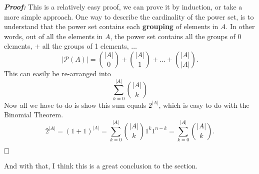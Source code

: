 \documentclass{report}
\begin{document}
\textbf{\textit{Proof:}} This is a relatively easy proof, we can prove it by induction, or take a more simple approach. One way to describe the cardinality of the power set, is to understand
that the power set contains each \textbf{grouping} of elements in $A$. In other words, out of all the elements in $A$, the power set contains all the groups of 0 elements, $+$ all the groups of 1 elements, $\dots$
$$|\mathcal{P}(A)| = {|A| \choose 0} + {|A| \choose 1} + \dots + {|A| \choose |A|}.$$
This can easily be re-arranged into $$\sum_{k=0}^{|A|}{|A| \choose k}$$
Now all we have to do is show this sum equals $2^{|A|}$, which is easy to do with the Binomial Theorem.
$$2^{|A|} = (1 + 1)^{|A|} = \sum_{k = 0}^{|A|}{|A| \choose k} 1^k 1^{n-k} = \sum_{k = 0}^{|A|}{|A| \choose k}.$$

$\hfill \square$

And with that, I think this is a great conclusion to the section.
\end{document}
